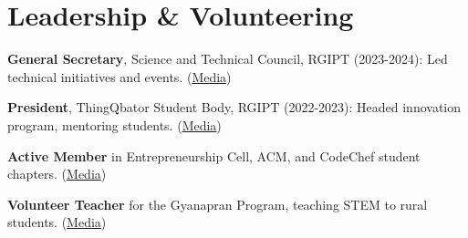 \documentclass[a4paper]{article}
\begin{document}
\section{Leadership \& Volunteering}
\begin{resumeSubHeadingList}
    \item{\textbf{General Secretary}, Science and Technical Council, RGIPT (2023-2024): Led technical initiatives and events. (\href{https://sai.fhaida.com/\#leadership-1}{Media})}
    \item{\textbf{President}, ThingQbator Student Body, RGIPT (2022-2023): Headed innovation program, mentoring students. (\href{https://sai.fhaida.com/\#leadership-2}{Media})}
    \item{\textbf{Active Member} in Entrepreneurship Cell, ACM, and CodeChef student chapters. (\href{https://sai.fhaida.com/\#leadership-3}{Media})}
    \item{\textbf{Volunteer Teacher} for the Gyanapran Program, teaching STEM to rural students. (\href{https://sai.fhaida.com/\#volunteer-1}{Media})}
\end{resumeSubHeadingList}
\end{document}
